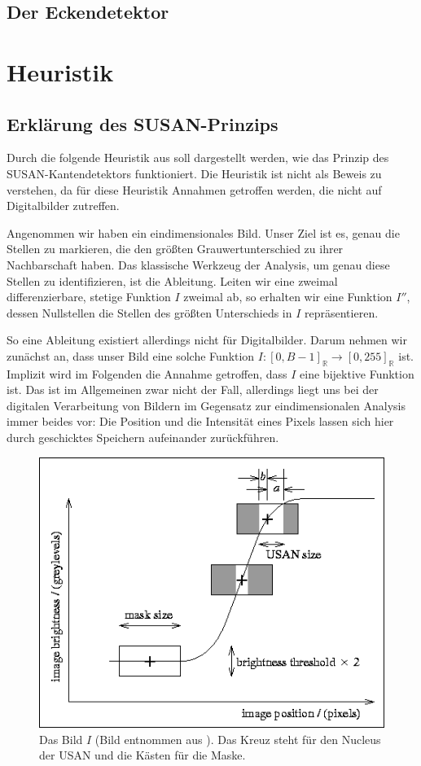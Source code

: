 \documentclass[a4paper, 11pt]{report}
\theoremstyle{definition}
\begin{document}
			\subsection{Der Eckendetektor}
			

		\section{Heuristik}
			\subsection{Erklärung des SUSAN-Prinzips}
			 	Durch die folgende Heuristik aus \cite{SUSAN} soll dargestellt werden, wie das Prinzip des SUSAN-Kantendetektors funktioniert. Die Heuristik ist nicht als Beweis zu verstehen, da für diese Heuristik Annahmen getroffen werden, die nicht auf Digitalbilder zutreffen.

			 	Angenommen wir haben ein eindimensionales Bild. Unser Ziel ist es, genau die Stellen zu markieren, die den größten Grauwertunterschied zu ihrer Nachbarschaft haben. Das klassische Werkzeug der Analysis, um genau diese Stellen zu identifizieren, ist die Ableitung. Leiten wir eine zweimal differenzierbare, stetige Funktion $I$ zweimal ab, so erhalten wir eine Funktion $I''$, dessen Nullstellen die Stellen des größten Unterschieds in $I$ repräsentieren.

			 	So eine Ableitung existiert allerdings nicht für Digitalbilder. Darum nehmen wir zunächst an, dass unser Bild eine solche Funktion $I: [0, B-1]_\mathbb{R} \to [0,255]_\mathbb{R}$ ist. Implizit wird im Folgenden die Annahme getroffen, dass $I$ eine bijektive Funktion ist. Das ist im Allgemeinen zwar nicht der Fall, allerdings liegt uns bei der digitalen Verarbeitung von Bildern im Gegensatz zur eindimensionalen Analysis immer beides vor: Die Position und die Intensität eines Pixels lassen sich hier durch geschicktes Speichern aufeinander zurückführen.

			 	\begin{figure}[H]
			 		\centering
			 		\includegraphics[width=.7\textwidth]{assets/susan-graph.png}
			 		\caption{Das Bild $I$ (Bild entnommen aus \cite{SUSAN}). Das Kreuz steht für den Nucleus der USAN und die Kästen für die Maske.}
			 		\label{fig:susan-graph}
			 	\end{figure}
\end{document}
